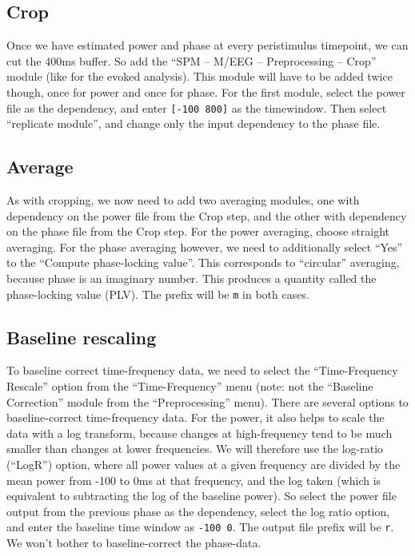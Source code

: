 \subsection{Crop}

Once we have estimated power and phase at every peristimulus timepoint, we can cut the 400ms buffer. So add the ``SPM -- M/EEG -- Preprocessing -- Crop'' module (like for the evoked analysis). This module will have to be added twice though, once for power and once for phase. For the first module, select the power file as the dependency, and enter \texttt{[-100 800]} as the timewindow. Then select ``replicate module'', and change only the input dependency to the phase file.

\subsection{Average}

As with cropping, we now need to add two averaging modules, one with dependency on the power file from the Crop step, and the other with dependency on the phase file from the Crop step. For the power averaging, choose straight averaging. For the phase averaging however, we need to additionally select ``Yes'' to the ``Compute phase-locking value''. This corresponds to ``circular'' averaging, because phase is an imaginary number. This produces a quantity called the phase-locking value (PLV). The prefix will be \texttt{m} in both cases. 

\subsection{Baseline rescaling}

To baseline correct time-frequency data, we need to select the ``Time-Frequency Rescale'' option from the ``Time-Frequency'' menu (note: not the ``Baseline Correction'' module from the ``Preprocessing'' menu). There are several options to baseline-correct time-frequency data. For the power, it also helps to scale the data with a log transform, because changes at high-frequency tend to be much smaller than changes at lower frequencies. We will therefore use the log-ratio (``LogR'') option, where all power values at a given frequency are divided by the mean power from -100 to 0ms at that frequency, and the log taken (which is equivalent to subtracting the log of the baseline power). So select the power file output from the previous phase as the dependency, select the log ratio option, and enter the baseline time window as \texttt{-100 0}. The output file prefix will be \texttt{r}. We won't bother to baseline-correct the phase-data.

